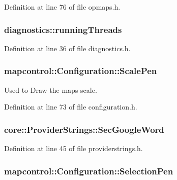 Definition at line 76 of file opmaps.\-h.

\hypertarget{group___o_p_map_widget_gae7dc693c162396310de691f67b4b0e99}{
\subsubsection[{running\-Threads}]{ diagnostics\-::running\-Threads}}\label{group___o_p_map_widget_gae7dc693c162396310de691f67b4b0e99}


Definition at line 36 of file diagnostics.\-h.

\hypertarget{group___o_p_map_widget_gab4e66a6217ae69c3344a0af8578f5932}{
\subsubsection[{Scale\-Pen}]{\setlength{\rightskip}{0pt plus 5cm}mapcontrol\-::\-Configuration\-::\-Scale\-Pen}}\label{group___o_p_map_widget_gab4e66a6217ae69c3344a0af8578f5932}


Used to Draw the maps scale. 



Definition at line 73 of file configuration.\-h.

\hypertarget{group___o_p_map_widget_gaa681a15654ccc6246baadb0d3e51e660}{
\subsubsection[{Sec\-Google\-Word}]{ core\-::\-Provider\-Strings\-::\-Sec\-Google\-Word}}\label{group___o_p_map_widget_gaa681a15654ccc6246baadb0d3e51e660}


Definition at line 45 of file providerstrings.\-h.

\hypertarget{group___o_p_map_widget_gab3ccb3d980f16de07166bad27b8ff4dc}{
\subsubsection[{Selection\-Pen}]{\setlength{\rightskip}{0pt plus 5cm}mapcontrol\-::\-Configuration\-::\-Selection\-Pen}}\label{group___o_p_map_widget_gab3ccb3d980f16de07166bad27b8ff4dc}


